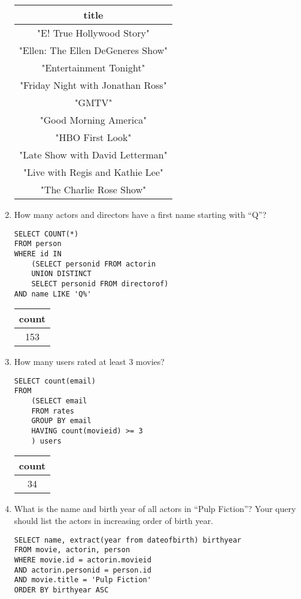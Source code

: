 \begin{enumerate}
\begin{tabular}{|c|}
\hline
title \\ \hline
"E! True Hollywood Story" \\ \hline
"Ellen: The Ellen DeGeneres Show" \\ \hline
"Entertainment Tonight" \\ \hline
"Friday Night with Jonathan Ross" \\ \hline
"GMTV" \\ \hline
"Good Morning America" \\ \hline
"HBO First Look" \\ \hline
"Late Show with David Letterman" \\ \hline
"Live with Regis and Kathie Lee" \\ \hline
"The Charlie Rose Show" \\ \hline
\end{tabular}

\item How many actors and directors have a ﬁrst name starting with “Q”?

\begin{lstlisting}
SELECT COUNT(*)
FROM person
WHERE id IN
	(SELECT personid FROM actorin
	UNION DISTINCT
	SELECT personid FROM directorof)
AND name LIKE 'Q%'
\end{lstlisting}

\begin{tabular}{|c|}
\hline
count \\ \hline
153 \\ \hline
\end{tabular}

\item How many users rated at least 3 movies?

\begin{lstlisting}
SELECT count(email)
FROM 
	(SELECT email
	FROM rates
	GROUP BY email
	HAVING count(movieid) >= 3
	) users
\end{lstlisting}

\begin{tabular}{|c|}
\hline
count \\ \hline
34 \\ \hline
\end{tabular}

\item What is the name and birth year of all actors in “Pulp Fiction”? Your query should list the actors in increasing order of birth year.

\begin{lstlisting}
SELECT name, extract(year from dateofbirth) birthyear
FROM movie, actorin, person
WHERE movie.id = actorin.movieid
AND actorin.personid = person.id
AND movie.title = 'Pulp Fiction'
ORDER BY birthyear ASC
\end{lstlisting}


\end{enumerate}
